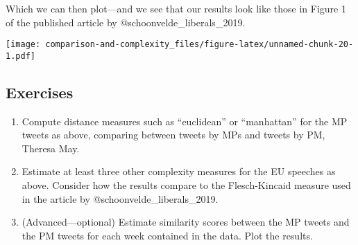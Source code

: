 \documentclass[
]{article}
\newenvironment{Shaded}{\begin{snugshade}}{\end{snugshade}}
\newcommand{\AttributeTok}[1]{\textcolor[rgb]{0.13,0.29,0.53}{#1}}
\newcommand{\DecValTok}[1]{\textcolor[rgb]{0.00,0.00,0.81}{#1}}
\newcommand{\FunctionTok}[1]{\textcolor[rgb]{0.13,0.29,0.53}{\textbf{#1}}}
\newcommand{\NormalTok}[1]{#1}
\newcommand{\SpecialCharTok}[1]{\textcolor[rgb]{0.81,0.36,0.00}{\textbf{#1}}}
\newcommand{\StringTok}[1]{\textcolor[rgb]{0.31,0.60,0.02}{#1}}
\providecommand{\tightlist}{%
  \setlength{\itemsep}{0pt}\setlength{\parskip}{0pt}}
\begin{document}
Which we can then plot---and we see that our results look like those in
Figure 1 of the published article by @schoonvelde\_liberals\_2019.

\begin{Shaded}
\end{Shaded}

\texttt{[image: comparison-and-complexity\_files/figure-latex/unnamed-chunk-20-1.pdf]}

\subsection{Exercises}\label{exercises}

\begin{enumerate}
\def\labelenumi{\arabic{enumi}.}
\tightlist
\item
  Compute distance measures such as ``euclidean'' or ``manhattan'' for
  the MP tweets as above, comparing between tweets by MPs and tweets by
  PM, Theresa May.
\item
  Estimate at least three other complexity measures for the EU speeches
  as above. Consider how the results compare to the Flesch-Kincaid
  measure used in the article by @schoonvelde\_liberals\_2019.
\item
  (Advanced---optional) Estimate similarity scores between the MP tweets
  and the PM tweets for each week contained in the data. Plot the
  results.
\end{enumerate}
\end{document}

